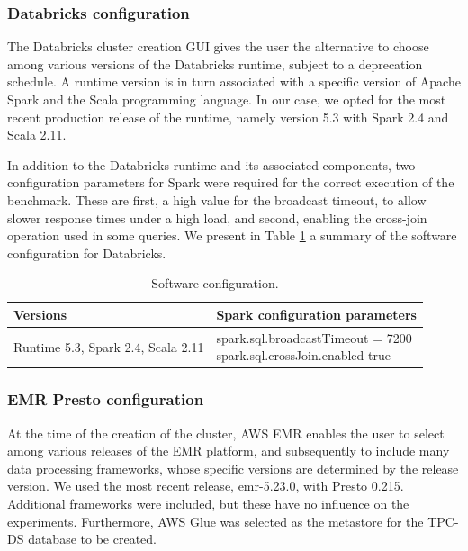 \subsubsection{Databricks configuration}

The Databricks cluster creation GUI gives the user the alternative to choose among various versions of the Databricks runtime, subject to a deprecation schedule. A runtime version is in turn associated with a specific version of Apache Spark and the Scala programming language. In our case, we opted for the most recent production release of the runtime, namely version 5.3 with Spark 2.4 and Scala 2.11.

In addition to the Databricks runtime and its associated components, two configuration parameters for Spark were required for the correct execution of the benchmark. These are first, a high value for the broadcast timeout, to allow slower response times under a high load, and second, enabling the cross-join operation used in some queries. We present in Table \ref{table:softwareConfDatabricks} a summary of the software configuration for Databricks.

\begin{table}
  \centering
	\begin{tabular}{|l|l|}
	  \hline
		\textbf{Versions} & \textbf{Spark configuration parameters} \\ \hline
		Runtime 5.3, Spark 2.4, Scala 2.11 & \makecell[l]{spark.sql.broadcastTimeout = 7200 \\ spark.sql.crossJoin.enabled true} \\ \hline
	\end{tabular}
	\caption{Software configuration.}
	\label{table:softwareConfDatabricks}
\end{table}

\subsubsection{EMR Presto configuration}

At the time of the creation of the cluster, AWS EMR enables the user to select among various releases of the EMR platform, and subsequently to include many data processing frameworks, whose specific versions are determined by the release version. We used the most recent release, emr-5.23.0, with Presto 0.215. Additional frameworks were included, but these have no influence on the experiments. Furthermore, AWS Glue was selected as the metastore for the TPC-DS database to be created.

